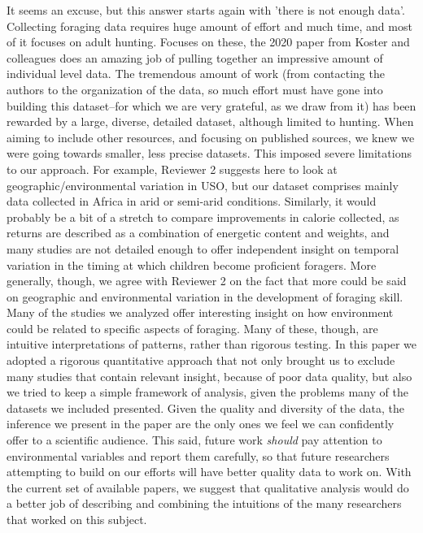 \documentclass{article}
\newcommand{\rev}[1]{{\color{ForestGreen}#1}}
\begin{document}
\begin{enumerate}
\rev{It seems an excuse, but this answer starts again with 'there is not enough data'. Collecting foraging data requires huge amount of effort and much time, and most of it focuses on adult hunting. Focuses on these, the 2020 paper from Koster and colleagues does an amazing job of pulling together an impressive amount of individual level data. The tremendous amount of work (from contacting the authors to the organization of the data, so much effort must have gone into building this dataset--for which we are very grateful, as we draw from it) has been rewarded by a large, diverse, detailed dataset, although limited to hunting. When aiming to include other resources, and focusing on published sources, we knew we were going towards smaller, less precise datasets. This imposed severe limitations to our approach. For example, Reviewer 2 suggests here to look at geographic/environmental variation in USO, but our dataset comprises mainly data collected in Africa in arid or semi-arid conditions. Similarly, it would probably be a bit of a stretch to compare improvements in calorie collected, as returns are described as a combination of energetic content and weights, and many studies are not detailed enough to offer independent insight on temporal variation in the timing at which children become proficient foragers. More generally, though, we agree with Reviewer 2 on the fact that more could be said on geographic and environmental variation in the development of foraging skill. Many of the studies we analyzed offer interesting insight on how environment could be related to specific aspects of foraging. Many of these, though, are intuitive interpretations of patterns, rather than rigorous testing. In this paper we adopted a rigorous quantitative approach that not only brought us to exclude many studies that contain relevant insight, because of poor data quality, but also we tried to keep a simple framework of analysis, given the problems many of the datasets we included presented. Given the quality and diversity of the data, the inference we present in the paper are the only ones we feel we can confidently offer to a scientific audience. This said, future work \textit{should} pay attention to environmental variables and report them carefully, so that future researchers attempting to build on our efforts will have better quality data to work on. With the current set of available papers, we suggest that qualitative analysis would do a better job of describing and combining the intuitions of the many researchers that worked on this subject. } %
\end{enumerate}
\end{document}
